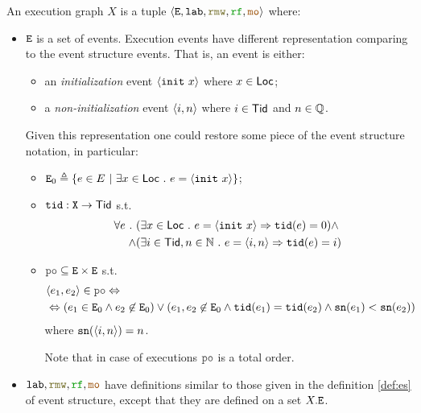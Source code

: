 \documentclass[12pt]{article}
\begin{document}
\begin{definition}
  \label{def:exec}
  
  An execution graph $X$ is a tuple $\tup{\lE, \lLAB, \lRMW, \lRF, \lMO}$ where:
  \begin{itemize}

  \item ${\mathtt{E}}$ is a set of events. 
    Execution events have different representation comparing to the event structure events. 
    That is, an event is either:
    \begin{itemize}
      \item an \emph{initialization} event $\langle {\mathtt{init}}~x \rangle$ where $x \in \mathsf{Loc}$;
      \item a \emph{non-initialization} event $\langle i, n \rangle$ where $i \in \mathsf{Tid}$ and $n \in {\mathbb{Q}}$.
    \end{itemize}
    Given this representation one could restore some piece of the event structure notation, 
    in particular:
    \begin{itemize}

      \item ${\mathtt{E}}_{0} \triangleq \{e \in E ~|~ \exists{x} \in \mathsf{Loc} ~.~ e = \langle {\mathtt{init}}~x \rangle\}$;

      \item ${\mathtt{tid}} : {\mathtt{X}} \rightarrow \mathsf{Tid}$ s.t. \\
        \begin{equation*}
          \begin{split}
            \forall{e} ~.~
            & (\exists{x \in \mathsf{Loc}} ~.~ e = \langle {\mathtt{init}}~x \rangle \Rightarrow {\mathtt{tid}}(e) = 0) \wedge \\ \wedge
            & (\exists{i \in \mathsf{Tid}, n \in {\mathbb{N}}} ~.~ e = \langle i, n \rangle \Rightarrow {\mathtt{tid}}(e) = i)
          \end{split}
        \end{equation*}
        
      \item $\lPO \subseteq \lE \times \lE$ s.t. \\
        \begin{equation*}
          \begin{split}
            & \tup{e_1, e_2} \in \lPO \Leftrightarrow \\
            & \Leftrightarrow (e_1 \in \lEo \wedge e_2 \not\in \lEo) \vee 
              (e_1, e_2 \not\in \lEo \wedge \lTID(e_1) = \lTID(e_2) \wedge
              \lSN(e_1) < \lSN(e_2))
          \end{split}
        \end{equation*}
        where ${\mathtt{sn}}(\langle i, n \rangle) = n$.

        Note that in case of executions $\lPO$ is a total order.
    \end{itemize}
    
  \item $\lLAB, \lRMW, \lRF, \lMO$ have definitions similar to those given
    in the definition \ref{def:es} of event structure,
    except that they are defined on a set $X.{\mathtt{E}}$.

  \end{itemize}
\end{definition}
\end{document}
